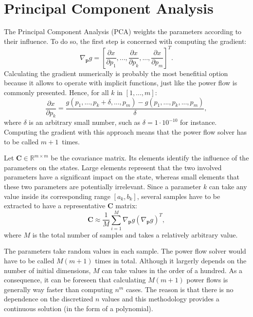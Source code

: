 \section{Principal Component Analysis}
The Principal Component Analysis (PCA) weights the parameters according to their influence. To do so, the first step is concerned with computing the gradient:
\begin{equation}
  \nabla_{\mathbf{p}}g = \left[\frac{\partial x}{\partial p_1}, ..., \frac{\partial x}{\partial p_k}, ..., \frac{\partial x}{\partial p_m} \right]^T.
  \label{eq:grad1}
\end{equation}
Calculating the gradient numerically is probably the most benefitial option because it allows to operate with implicit functions, just like the power flow is commonly presented. Hence, for all $k$ in $[1,...,m]$:
\begin{equation}
  \frac{\partial x}{\partial p_k} = \frac{g(p_1,...,p_k + \delta,...,p_m) - g(p_1,...,p_k,...,p_m)}{\delta},
  \label{eq:grad2}
\end{equation}
where $\delta$ is an arbitrary small number, such as $\delta=1\cdot 10^{-10}$ for instance. Computing the gradient with this approach means that the power flow solver has to be called $m+1$~times. 

Let $\mathbf{C}\in \mathbb{R}^{m \times m}$ be the covariance matrix. Its elements identify the influence of the parameters on the states. Large elements represent that the two involved parameters have a significant impact on the state, whereas small elements that these two parameters are potentially irrelevant. Since a parameter $k$ can take any value inside its corresponding range $[a_k,b_k]$, several samples have to be extracted to have a representative $\mathbf{C}$ matrix:
\begin{equation}
  \mathbf{C} \approx \frac{1}{M} \sum_{i=1}^M \nabla_{\mathbf{p}}g (\nabla_{\mathbf{p}}g)^T,
  \label{eq:C1}
\end{equation}
where $M$ is the total number of samples and takes a relatively arbitrary value. 

The parameters take random values in each sample. The power flow solver would have to be called $M(m+1)$ times in total. Although it largerly depends on the number of initial dimensions, $M$ can take values in the order of a hundred. As a consequence, it can be foreseen that calculating $M(m+1)$ power flows is generally way faster than computing $n^m$ cases. The reason is that there is no dependence on the discretized $n$ values and this methodology provides a continuous solution (in the form of a polynomial). 


